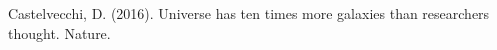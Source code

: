 \documentclass[runningheads]{llncs}
\begin{document}
\begin{thebibliography}{8}

Castelvecchi, D. (2016). Universe has ten times more galaxies than researchers thought. Nature. 


\end{thebibliography}
\end{document}
